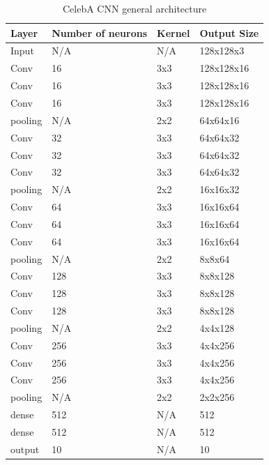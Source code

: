 \begin{table}[]
\centering
\begin{tabular}{|l|l|l|l|}
\hline
Layer   & Number of neurons & Kernel & Output Size \\ \hline
Input   &       N/A            &   N/A     &   128x128x3          \\ \hline
Conv    &    16               &   3x3     & 128x128x16          \\ \hline
Conv    &      16             &  3x3       &     128x128x16         \\ \hline
Conv    &      16             &  3x3       &     128x128x16        \\ \hline
pooling &      N/A             &   2x2     &   64x64x16           \\ \hline
Conv    &    32               &   3x3     & 64x64x32          \\ \hline
Conv    &      32             &  3x3       &    64x64x32        \\ \hline
Conv    &      32             &  3x3       &     64x64x32         \\ \hline
pooling &      N/A             &   2x2     &    16x16x32          \\ \hline
Conv    &    64               &   3x3     & 16x16x64          \\ \hline
Conv    &      64             &  3x3       &    16x16x64      \\ \hline
Conv    &      64             &  3x3       &    16x16x64       \\ \hline
pooling &      N/A             &   2x2     &    8x8x64          \\ \hline
Conv    &    128               &   3x3     & 8x8x128         \\ \hline
Conv    &      128             &  3x3       &     8x8x128         \\ \hline
Conv    &      128             &  3x3       &     8x8x128         \\ \hline
pooling &      N/A             &   2x2     &    4x4x128           \\ \hline
Conv    &    256               &   3x3     & 4x4x256         \\ \hline
Conv    &     256             &  3x3       &     4x4x256         \\ \hline
Conv    &      256             &  3x3       &     4x4x256         \\ \hline
pooling &      N/A             &   2x2     &    2x2x256          \\ \hline
dense   &       512            &    N/A     &     512        \\ \hline
dense   &       512            &    N/A     &     512        \\ \hline
output   &       10            &    N/A     &     10        \\ \hline
\end{tabular}
\caption{CelebA CNN general architecture}
  \label{table:CelebA_CNN_arch}  
\end{table}

